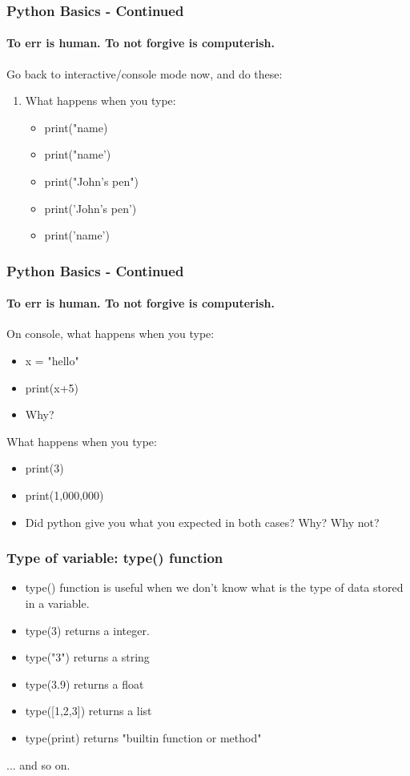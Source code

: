 \documentclass{beamer}
\begin{document}
\begin{frame}
\frametitle{Python Basics - Continued}
\framesubtitle{To err is human. To not forgive is computerish.}
Go back to interactive/console mode now, and do these:
\begin{enumerate}
\item What happens when you type: 
\begin{itemize}
\item print("name)
\item print("name')
\item print("John's pen")
\item print('John's pen')
\item print('name')
\end{itemize}
\end{enumerate}
\end{frame}

\begin{frame}
\frametitle{Python Basics - Continued}
\framesubtitle{To err is human. To not forgive is computerish.}
On console, what happens when you type: 
\begin{itemize}
\item x = "hello"
\item print(x+5)
\pause \item Why?
\end{itemize} \pause
What happens when you type:
\begin{itemize}
\item print(3)
\item print(1,000,000)
\pause \item Did python give you what you expected in both cases? Why? Why not?
\end{itemize}
\end{frame}

\begin{frame}
\frametitle{Type of variable: type() function}
\begin{itemize}
\item type() function is useful when we don't know what is the type of data stored in a variable.
\item type(3) returns a integer.
\item type("3") returns a string
\item type(3.9) returns a float
\item type([1,2,3]) returns a list
\item type(print) returns "builtin function or method" 
\end{itemize}
... and so on.
\end{frame}
\end{document}
